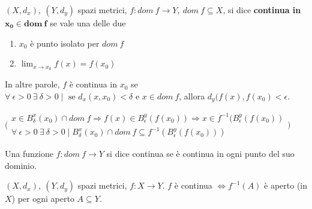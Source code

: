 \begin{definition}	
	$(X,d_x), \ (Y,d_y)$ spazi metrici, $f:dom \ f \rightarrow Y, \ dom \ f \subseteq X$, si dice \textbf{continua in } $\mathbf{x_0 \in dom \ f}$ se vale una delle due
	\begin{enumerate}
		\item $x_0$ è punto isolato per $dom \ f$
		\item $\lim_{x \rightarrow x_0} f(x) = f(x_0)$
	\end{enumerate}
	
	In altre parole, $f$ è continua in $x_0$ se $\forall \ \epsilon > 0 \ \exists \ \delta > 0 \; \big| \; \text{ se } d_x(x, x_0) < \delta \text{ e } x \in dom \ f$, allora $d_y(f(x), f(x_0) < \epsilon$. 
	

	$\bigg( \begin{array}{l}
	x \in B_{\delta}^{x}(x_0) \cap dom \ f \Rightarrow f(x) \in B_{\epsilon}^{y} (f(x_0)) \Rightarrow x \in f^{-1}(B_{\epsilon}^{y} (f(x_0))
	\\
	\forall \ \epsilon > 0 \ \exists \ \delta > 0 \; \big| \; B_{\delta}^{x}(x_0) \cap dom \ f \subseteq f^{-1} (B_{\epsilon}^{y} (f(x_0)))
	\end{array}
	\bigg)$
	
	Una funzione $f:dom \ f \rightarrow Y $ si dice continua se è continua in ogni punto del suo dominio.
\end{definition}


\begin{theorem}
	\label{th: pag172}
	$(X,d_x), \ (Y,d_y)$ spazi metrici, $f:X \rightarrow Y$. $f$ è continua $\iff f^{-1}(A)$ è aperto (in $X$) per ogni aperto $A \subseteq Y$.
\end{theorem}


